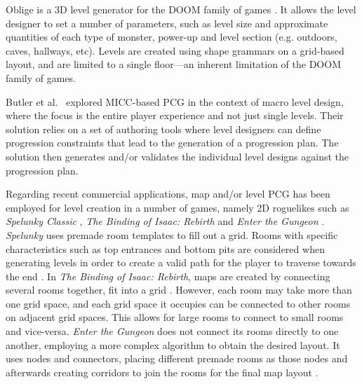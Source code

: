 \documentclass[journal]{IEEEtran}
\begin{document}
Oblige is a 3D level generator for the DOOM family of games \cite{apted2017oblige}.
It allows the level designer to set a number of parameters, such as level size and
approximate quantities of each type of monster, power-up and level section (e.g. outdoors,
caves, hallways, etc). Levels are created using shape grammars on a grid-based layout,
and are limited to a single floor---an inherent limitation of the DOOM family of games.

Butler et al.~\cite{butler2013mixed} explored MICC-based PCG in the context of macro level
design, where the focus is the entire player experience and not just single levels. Their
solution relies on a set of authoring tools where level designers can define progression
constraints that lead to the generation of a progression plan. The solution then generates
and/or validates the individual level designs against the progression plan.

Regarding recent commercial applications, map and/or level PCG has been employed for level
creation in a number of games, namely 2D roguelikes such as \textit{Spelunky Classic}
\cite{yu2009spelunky}, \textit{The Binding of Isaac: Rebirth} \cite{mcmillen2014thebinding}
and \textit{Enter the Gungeon} \cite{dodgeroll2016enter}. \textit{Spelunky} uses premade room
templates to fill out a grid. Rooms with specific characteristics such as top entrances and
bottom pits are considered when generating levels in order to create a valid path for the
player to traverse towards the end \cite{yu2016spelunky,kazemi2013spelunky}. In
\textit{The Binding of Isaac: Rebirth}, maps are created by connecting several rooms together,
fit into a grid \cite{florian2020isaacexp,cuttingroom2019isaac}. However, each
room may take more than one grid space, and each grid space it occupies can be connected to other
rooms on adjacent grid spaces. This allows for large rooms to connect to small rooms and
vice-versa. \textit{Enter the Gungeon} does not connect its rooms directly to one another,
employing a more complex algorithm to obtain the desired layout. It uses nodes and connectors,
placing different premade rooms as those nodes and afterwards creating corridors to join the
rooms for the final map layout \cite{boris2019gungeon}.
\end{document}
